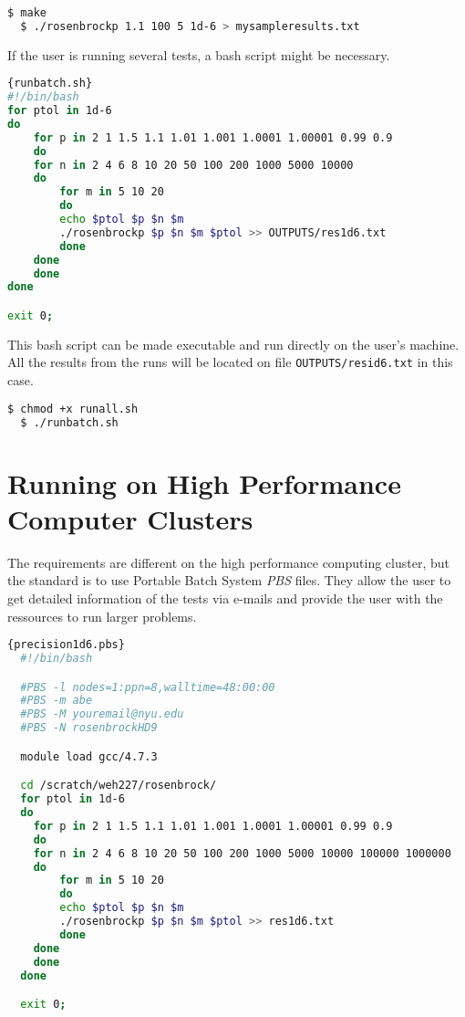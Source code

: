 \begin{lstlisting}[language=bash]
  $ make
  $ ./rosenbrockp 1.1 100 5 1d-6 > mysampleresults.txt
\end{lstlisting}

If the user is running several tests, a bash script might be necessary.

\begin{lstlisting}[language=bash]{runbatch.sh}
#!/bin/bash
for ptol in 1d-6
do
    for p in 2 1 1.5 1.1 1.01 1.001 1.0001 1.00001 0.99 0.9
    do
	for n in 2 4 6 8 10 20 50 100 200 1000 5000 10000
	do
	    for m in 5 10 20
	    do
		echo $ptol $p $n $m
		./rosenbrockp $p $n $m $ptol >> OUTPUTS/res1d6.txt
	    done
	done
    done
done

exit 0;
\end{lstlisting}

This bash script can be made executable and run directly on the user's machine. All the results from the runs will be located on file \texttt{OUTPUTS/resid6.txt} in this case.

\begin{lstlisting}[language=bash]
  $ chmod +x runall.sh
  $ ./runbatch.sh
\end{lstlisting}

\section{Running on High Performance Computer Clusters}

The requirements are different on the high performance computing cluster, but the standard is to use Portable Batch System \emph{PBS} files. They allow the user to get detailed information of the tests via e-mails and provide the user with the ressources to run larger problems.

\begin{lstlisting}[language=bash]{precision1d6.pbs}
  #!/bin/bash

  #PBS -l nodes=1:ppn=8,walltime=48:00:00
  #PBS -m abe
  #PBS -M youremail@nyu.edu
  #PBS -N rosenbrockHD9

  module load gcc/4.7.3

  cd /scratch/weh227/rosenbrock/
  for ptol in 1d-6
  do
    for p in 2 1 1.5 1.1 1.01 1.001 1.0001 1.00001 0.99 0.9
    do
	for n in 2 4 6 8 10 20 50 100 200 1000 5000 10000 100000 1000000
	do
	    for m in 5 10 20
	    do
		echo $ptol $p $n $m
		./rosenbrockp $p $n $m $ptol >> res1d6.txt
	    done
	done
    done
  done

  exit 0;
\end{lstlisting}

